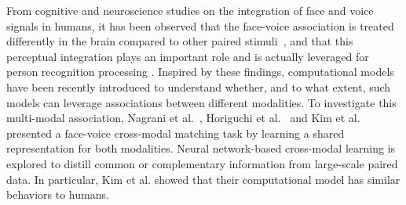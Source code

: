 \documentclass{article}
\begin{document}
From cognitive and neuroscience studies on the integration of face and voice signals in humans, it has been observed that the face-voice association is treated differently in the brain compared to other paired stimuli~\cite{von2006implicit}, and that this perceptual integration plays an important role and is actually leveraged for person recognition processing \cite{hasan2016hearing}.    
Inspired by these findings, computational models have been recently introduced to understand whether, and to what extent, such models can leverage associations between different modalities.
To investigate this multi-modal association, Nagrani et al.~\cite{nagrani2018seeing}, Horiguchi et al.~\cite{horiguchi2018face} and Kim et al.~\cite{kim2018learning} presented a face-voice cross-modal matching task by learning a shared representation for both modalities.
Neural network-based cross-modal learning is explored to distill common or complementary information from large-scale paired data.
In particular, Kim et al. showed that their computational model has similar behaviors to humans.
\end{document}
